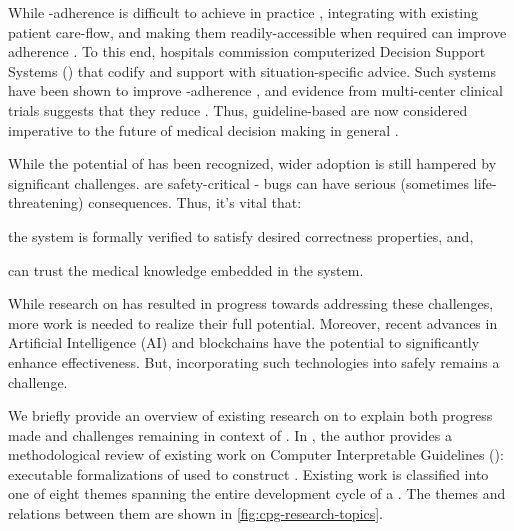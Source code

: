 While \BPG{}-adherence is difficult to achieve in
practice \cite{RandJAMA99,DavisCMAJ97},
integrating \BPGs{} with existing patient care-flow,
and making them readily-accessible when required can improve adherence \cite{WoolfBMJ99}.
To this end, hospitals commission computerized Decision Support Systems (\CDSSs{})
that codify \BPGs{} and support \HCPs{} with situation-specific advice.
Such systems have been shown to improve \BPG{}-adherence \cite{GargJAMA06,KawamotoBMJ05}, and evidence from multi-center clinical trials
suggests that they reduce \PMEs{} \cite{BenettJAMIA16,SahotaJIS11}.
Thus, guideline-based \CDSSs{} are now considered imperative to the
future of medical decision making in general \cite{JamesNEJM01}.

While the potential of \CDSS{} has been recognized, wider adoption
is still hampered by significant challenges. \CDSSs{} are safety-critical -
bugs can have serious (sometimes life-threatening) consequences.
Thus, it's vital that:
\begin{enumerate*}[label=(\alph*)]
  \item the system is formally verified to satisfy desired correctness
    properties, and,
  \item \HCPs{} can trust the medical knowledge embedded in the system.
\end{enumerate*}
While research on \CDSSs{} has resulted in progress towards addressing
these challenges, more work is needed to realize their full potential.
Moreover, recent advances in Artificial Intelligence (AI) and blockchains
have the potential to significantly enhance \CDSS{} effectiveness.
But, incorporating such technologies into \CDSSs{} safely remains a challenge.

We briefly provide an overview of existing research on \CDSSs{} to explain
both progress made and challenges remaining in context of \CDSSs{}.
In \cite{PelegJBI13}, the author provides a methodological review of
existing work on Computer Interpretable Guidelines (\CIGs{}): executable
formalizations of \BPGs{} used to construct \CDSSs{}.
Existing work is classified into one of eight themes spanning
the entire development cycle of a \CIG{}. The themes and relations between them
are shown in \figurename{} \ref{fig:cpg-research-topics}.

